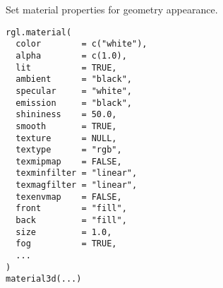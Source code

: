 \begin{Description}\relax
Set material properties for geometry appearance.
\end{Description}
\begin{Usage}
\begin{verbatim}
rgl.material(
  color        = c("white"),
  alpha        = c(1.0),
  lit          = TRUE, 
  ambient      = "black",
  specular     = "white", 
  emission     = "black", 
  shininess    = 50.0, 
  smooth       = TRUE,
  texture      = NULL, 
  textype      = "rgb", 
  texmipmap    = FALSE, 
  texminfilter = "linear", 
  texmagfilter = "linear",
  texenvmap    = FALSE,
  front        = "fill", 
  back         = "fill",
  size         = 1.0, 
  fog          = TRUE, 
  ...
)
material3d(...)
\end{verbatim}
\end{Usage}
